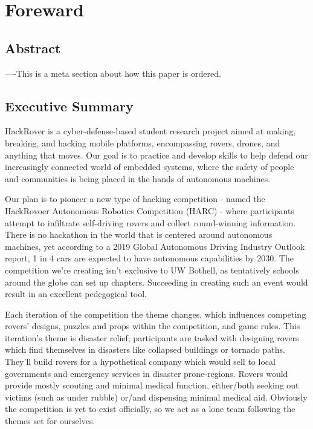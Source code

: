 \documentclass[a4paper, 10pt]{article}
\begin{document}
\begin{titlepage}
\end{titlepage}

\pagebreak{}

\tableofcontents

\pagebreak{}

\section*{Foreward}
	\subsection*{Abstract}
	----This is a meta section about how this paper is ordered.	
	
	\subsection*{Executive Summary}
	HackRover is a cyber-defense-based student research project aimed at making, breaking, and hacking mobile platforms, encompassing rovers, drones, and anything that moves. Our goal is to practice and develop skills to help defend our increasingly connected world of embedded systems, where the safety of people and communities is being placed in the hands of autonomous machines.
	
	Our plan is to pioneer a new type of hacking competition - named the HackRovoer Autonomous Robotics Competition (HARC) - where participants attempt to infiltrate self-driving rovers and collect round-winning information. There is no hackathon in the world that is centered around autonomous machines, yet according to a 2019 Global Autonomous Driving Industry Outlook report, 1 in 4 cars are expected to have autonomous capabilities by 2030. The competition we’re creating isn’t exclusive to UW Bothell, as tentatively schools around the globe can set up chapters. Succeeding in creating such an event would result in an excellent pedegogical tool. 
	
	Each iteration of the competition the theme changes, which influences competing rovers' designs, puzzles and props within the competition, and game rules. This iteration's theme is disaster relief; participants are tasked with designing rovers which find themselves in disasters like collapsed buildings or tornado paths. They'll build rovers for a hypothetical company which would sell to local governments and emergency services in disaster prone-regions. Rovers would provide mostly scouting and minimal medical function, either/both seeking out victims (such as under rubble) or/and dispensing minimal medical aid. Obviously the competition is yet to exist officially, so we act as a lone team following the themes set for ourselves. 
	
\end{document}

